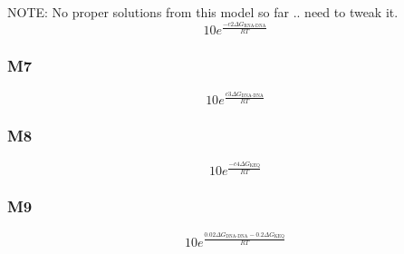 \documentclass[a4paper]{article}
\begin{document}
NOTE: No proper solutions from this model so far .. need to tweak it.
\begin{equation*}
	10e^{\frac{-c2\Delta G_{\text{RNA-DNA}}}{RT}}
\end{equation*}

\subsubsection{M7}

\begin{equation*}
	10e^{\frac{c3\Delta G_{\text{DNA-DNA}}}{RT}}
\end{equation*}

\subsubsection{M8}

\begin{equation*}
	10e^{\frac{-c4\Delta G_{\text{KEQ}}}{RT}}
\end{equation*}

\subsubsection{M9}

\begin{equation*}
	10e^{\frac{0.02\Delta G_{\text{DNA-DNA}} - 0.2\Delta G_{\text{KEQ}}}{RT}}
\end{equation*}
\end{document}
